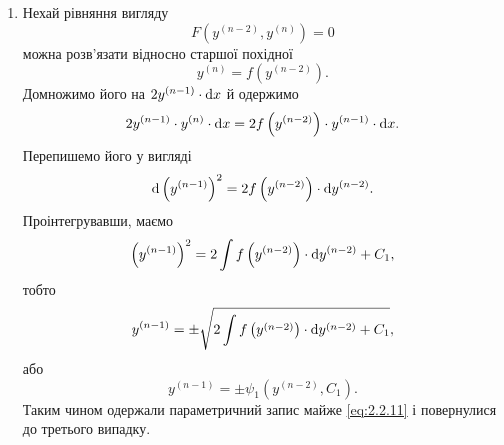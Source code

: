 \begin{enumerate}
\item Нехай рівняння вигляду
\begin{equation}
	\label{eq:2.2.15}
	F \left( y^{(n-2)}, y^{(n)} \right) = 0
\end{equation}
можна розв'язати відносно старшої похідної
\begin{equation}
	\label{eq:2.2.16}
	y^{(n)} = f \left( y^{(n-2)} \right).
\end{equation}
Домножимо його на $2 y^{(n-1)} \cdot \mathop{}\!\mathrm{d} x$ й одержимо
\begin{equation}
	\label{eq:2.2.17}
	2 y^{(n-1)} \cdot y^{(n)} \cdot \mathop{}\!\mathrm{d} x= 2 f \left( y^{(n-2)} \right) \cdot y^{(n-1)} \cdot \mathop{}\!\mathrm{d} x.
\end{equation}
Перепишемо його у вигляді
\begin{equation}
	\label{eq:2.2.18}
	\mathop{}\!\mathrm{d} \left( y^{(n-1)} \right)^2 = 2 f \left( y^{(n-2)} \right) \cdot \mathop{}\!\mathrm{d} y^{(n-2)}.
\end{equation}
Проінтегрувавши, маємо
\begin{equation}
	\label{eq:2.2.19}
	\left( y^{(n-1)} \right)^2 = 2 \int f \left( y^{(n-2)} \right) \cdot \mathop{}\!\mathrm{d} y^{(n-2)} + C_1,
\end{equation}
тобто 
\begin{equation}
	\label{eq:2.2.20}
	y^{(n-1)}  = \pm \sqrt{2 \int f \left( y^{(n-2)} \right) \cdot \mathop{}\!\mathrm{d} y^{(n-2)} + C_1},
\end{equation}
або
\begin{equation}
	\label{eq:2.2.21}
	y^{(n-1)}  = \pm \psi_1 \left( y^{(n-2)}, C_1 \right).
\end{equation}
Таким чином одержали параметричний запис майже \eqref{eq:2.2.11} і повернулися до третього випадку.

\end{enumerate}